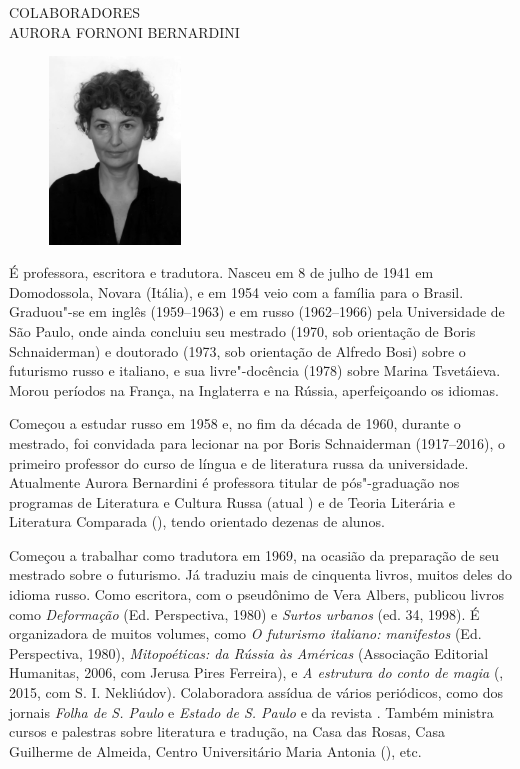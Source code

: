 \newpage
\small\MyriadPro
\label{autora}

\noindent{}COLABORADORES\\

\noindent{}AURORA FORNONI BERNARDINI


\begin{figure}
  \includegraphics[width=35mm]{./imgs/aurora.jpg}
 \end{figure}


É professora, escritora e tradutora. Nasceu em
8 de julho de 1941 em Domodossola, Novara (Itália), e em 1954 veio com a
família para o Brasil. Graduou"-se em inglês (1959--1963) e em russo
(1962--1966) pela Universidade de São Paulo, onde ainda concluiu seu
mestrado (1970, sob orientação de Boris Schnaiderman) e doutorado (1973,
sob orientação de Alfredo Bosi) sobre o futurismo russo e italiano, e
sua livre"-docência (1978) sobre Marina Tsvetáieva. Morou períodos na
França, na Inglaterra e na Rússia, aperfeiçoando os idiomas.

Começou a estudar russo em 1958 e, no fim da década de 1960, durante o
mestrado, foi convidada para lecionar na  por Boris Schnaiderman
(1917--2016), o primeiro professor do curso de língua e de literatura
russa da universidade. Atualmente Aurora Bernardini é professora titular
de pós"-graduação nos programas de Literatura e Cultura Russa (atual
) e de Teoria Literária e Literatura Comparada (), tendo
orientado dezenas de alunos.

Começou a trabalhar como tradutora em 1969, na ocasião da preparação de
seu mestrado sobre o futurismo. Já traduziu mais de cinquenta livros,
muitos deles do idioma russo. Como escritora, com o pseudônimo de Vera
Albers, publicou livros como \emph{Deformação} (Ed. Perspectiva, 1980) e
\emph{Surtos urbanos} (ed. 34, 1998). É organizadora de muitos volumes,
como \emph{O futurismo italiano: manifestos} (Ed. Perspectiva, 1980),
\emph{Mitopoéticas: da Rússia às Américas} (Associação Editorial
Humanitas, 2006, com Jerusa Pires Ferreira), e \emph{A estrutura do
conto de magia} (, 2015, com S. I. Nekliúdov). Colaboradora assídua
de vários periódicos, como dos jornais \emph{Folha de S. Paulo} e
\emph{Estado de S. Paulo} e da revista . Também ministra
cursos e palestras sobre literatura e tradução, na Casa das Rosas, Casa
Guilherme de Almeida, Centro Universitário Maria Antonia (), etc.

